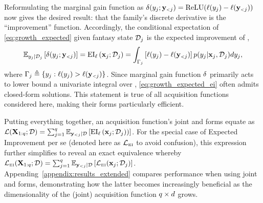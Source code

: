 Reformulating the \MM{} marginal gain function as \(\gain(\NEW{0}{\y}; \OLD{0}{\Y}) = \relu(\acq(\NEW{0}{\y}) - \acq(\OLD{0}{\Y}))\) now gives the desired result: that the \MM{} family's discrete derivative is the ``improvement'' function. Accordingly, the conditional expectation of \eqref{eq:growth_expected} given fantasy state \(\mathcal{D}_{j}\) is the expected improvement of \acq, \ie
\begin{align}
\E_{\NEW{0}{\y}|\data_{\roundIdx}}
    \left[
      \gain(\NEW{0}{\y}; \OLD{0}{\Y})
    \right]
    = \EI_{\acq}\left(\NEW{0}{\x}; \data_{\roundIdx}\right)
    = \int_{\NEW{0}{\Gamma}} \left[\acq(\NEW{0}{\y}) - \acq(\OLD{0}{\Y})\right] p(\NEW{0}{\y}| \NEW{0}{\x}, \data_{\roundIdx}) d\NEW{0}{\y},
\label{eq:growth_expected_ei}
\end{align}
where \(\NEW{1}{\Gamma} \triangleq \{\NEW{1}{\y} : \acq(\NEW{1}{\y}) > \acq(\OLD{1}{\Y})\}\).
% 
Since marginal gain function \(\delta\) primarily acts to lower bound a univariate integral over , \eqref{eq:growth_expected_ei} often admits closed-form solutions. This statement is true of all \MM{} acquisition functions considered here, making their \mmform{} forms particularly efficient.

Putting everything together, an \MM{} acquisition function's joint and \mmform{} forms equate as
\(
\Acq(\X_{1:\parallelism}; \data)
  =
  \sum_{\roundIdx=1}^{q} 
    \E_{\OLD{1}{\Y}|\data}
    \left[
        \EI_{\acq}\left(\NEW{0}{\x}; \data_{\roundIdx})\right)
    \right]
\). For the special case of Expected Improvement per se (denoted here as \(\mathcal{L}_{\scriptscriptstyle{\ensuremath{\operatorname{EI}}}}\) to avoid confusion), this expression further simplifies to reveal an exact equivalence whereby
\(
\Acq_{\acqSubscript{\EI}}(\X_{1:\parallelism}; \data)
  = \sum_{\roundIdx=1}^{q}\E_{\OLD{1}{\Y}|\data}
  \left[
    \Acq_{\acqSubscript{\EI}}(\NEW{1}{\x}; \data_{\roundIdx})
  \right]
\). 
Appending~\ref{appendix:results_extended} compares performance when using joint and \mmform{} forms, demonstrating how the latter becomes increasingly beneficial as the dimensionality of the (joint) acquisition function \(q \times d\) grows.


